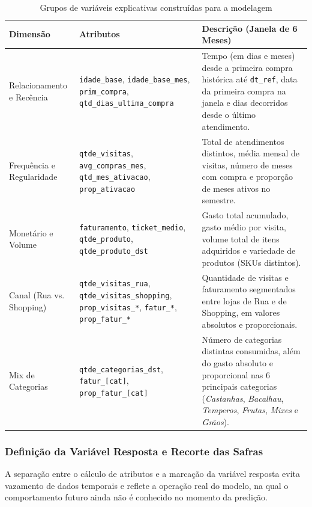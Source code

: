 \begin{table}[H]
\centering
\caption{Grupos de variáveis explicativas construídas para a modelagem}
\label{tab:book_features}
\footnotesize
\begin{tabular}{p{3.2cm}p{4.3cm}p{6.5cm}}
\toprule
\textbf{Dimensão} & \textbf{Atributos} & \textbf{Descrição (Janela de 6 Meses)} \\
\midrule
Relacionamento e Recência & \raggedright\texttt{idade\_base}, \texttt{idade\_base\_mes}, \texttt{prim\_compra}, \texttt{qtd\_dias\_ultima\_compra} & Tempo (em dias e meses) desde a primeira compra histórica até \texttt{dt\_ref}, data da primeira compra na janela e dias decorridos desde o último atendimento. \\
\addlinespace
Frequência e Regularidade & \raggedright\texttt{qtde\_visitas}, \texttt{avg\_compras\_mes}, \texttt{qtd\_mes\_ativacao}, \texttt{prop\_ativacao} & Total de atendimentos distintos, média mensal de visitas, número de meses com compra e proporção de meses ativos no semestre. \\
\addlinespace
Monetário e Volume & \raggedright\texttt{faturamento}, \texttt{ticket\_medio}, \texttt{qtde\_produto}, \texttt{qtde\_produto\_dst} & Gasto total acumulado, gasto médio por visita, volume total de itens adquiridos e variedade de produtos (SKUs distintos). \\
\addlinespace
Canal (Rua vs. Shopping) & \raggedright\texttt{qtde\_visitas\_rua}, \texttt{qtde\_visitas\_shopping}, \texttt{prop\_visitas\_*}, \texttt{fatur\_*}, \texttt{prop\_fatur\_*} & Quantidade de visitas e faturamento segmentados entre lojas de Rua e de Shopping, em valores absolutos e proporcionais. \\
\addlinespace
Mix de Categorias & \raggedright\texttt{qtde\_categorias\_dst}, \texttt{fatur\_[cat]}, \texttt{prop\_fatur\_[cat]} & Número de categorias distintas consumidas, além do gasto absoluto e proporcional nas 6 principais categorias (\textit{Castanhas}, \textit{Bacalhau}, \textit{Temperos}, \textit{Frutas}, \textit{Mixes} e \textit{Grãos}). \\
\bottomrule
\end{tabular}
\end{table}

\subsubsection{Definição da Variável Resposta e Recorte das Safras}
A separação entre o cálculo de atributos e a marcação da variável resposta evita vazamento de dados temporais e reflete a operação real do modelo, na qual o comportamento futuro ainda não é conhecido no momento da predição.

